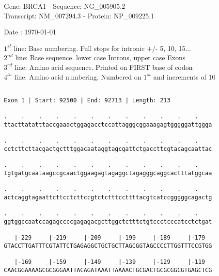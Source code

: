 \documentclass{article}
\begin{document}
\begin{center}
\begin{large}
Gene: BRCA1 - Sequence: NG\_005905.2\\
Transcript: NM\_007294.3 - Protein: NP\_009225.1
 
 Date : \today
\end{large}
\end{center}
$1^{st}$ line: Base numbering. Full stops for intronic +/- 5, 10, 15...\\
$2^{nd}$ line: Base sequence. lower case Introns, upper case Exons\\
$3^{rd}$ line: Amino acid sequence. Printed on FIRST base of codon\\
$4^{th}$ line: Amino acid numbering. Numbered on $1^{st}$ and increments of 10\\
 \begin{Verbatim}
 
Exon 1 | Start: 92500 | End: 92713 | Length: 213
 
.    .    .    .    .    .    .    .    .    .    .    .    
ttacttatatttaccgaaactggagacctccattagggcggaaagagtgggggattggga
                                                            
.    .    .    .    .    .    .    .    .    .    .    .    
cctcttcttacgactgctttggacaataggtagcgattctgaccttcgtacagcaattac
                                                            
.    .    .    .    .    .    .    .    .    .    .    .    
tgtgatgcaataagccgcaactggaagagtagaggctagagggcaggcactttatggcaa
                                                            
.    .    .    .    .    .    .    .    .    .    .    .    
actcaggtagaattcttcctcttccgtctctttccttttacgtcatccgggggcagactg
                                                            
.    .    .    .    .    .    .    .    .    .    .    .    
ggtggccaatccagagccccgagagacgcttggctctttctgtccctcccatcctctgat
                                                            
   |-229     |-219     |-209     |-199     |-189     |-179  
GTACCTTGATTTCGTATTCTGAGAGGCTGCTGCTTAGCGGTAGCCCCTTGGTTTCCGTGG
                                                            
   |-169     |-159     |-149     |-139     |-129     |-119  
CAACGGAAAAGCGCGGGAATTACAGATAAATTAAAACTGCGACTGCGCGGCGTGAGCTCG
                                                            

\end{Verbatim}
\end{document}
